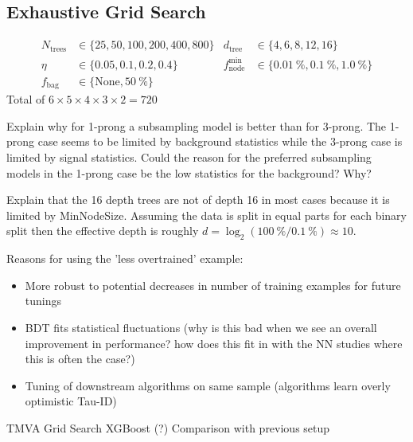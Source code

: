 
\subsection{Exhaustive Grid Search}
\label{sec:bdt_grid_search}

\begin{align*}
  N_\mathrm{trees} &\in \{25, 50, 100, 200, 400, 800\} &
  d_\mathrm{tree} &\in \{4, 6, 8, 12, 16\} \\
  \eta &\in \{0.05, 0.1, 0.2, 0.4\} &
  f_\mathrm{node}^\mathrm{min} &\in \{\SI{0.01}{\percent}, \SI{0.1}{\percent},\SI{1.0}{\percent}\} \\
  f_\text{bag} &\in \{\text{None}, \SI{50}{\percent} \}
\end{align*}
Total of $6 \times 5 \times 4 \times 3 \times 2 = 720$

Explain why for 1-prong a subsampling model is better than for 3-prong. The
1-prong case seems to be limited by background statistics while the 3-prong case
is limited by signal statistics. Could the reason for the preferred subsampling
models in the 1-prong case be the low statistics for the background? Why?

Explain that the 16 depth trees are not of depth 16 in most cases because it is
limited by MinNodeSize. Assuming the data is split in equal parts for each
binary split then the effective depth is roughly
$d = \log_2(\SI{100}{\percent} / \SI{0.1}{\percent}) \approx 10$.

Reasons for using the 'less overtrained' example:
\begin{itemize}
\item More robust to potential decreases in number of training examples for
  future tunings
\item BDT fits statistical fluctuations (why is this bad when we see an overall
  improvement in performance? how does this fit in with the NN studies where
  this is often the case?)
\item Tuning of downstream algorithms on same sample (algorithms learn overly
  optimistic Tau-ID)
\end{itemize}

TMVA Grid Search
XGBoost (?)
Comparison with previous setup


